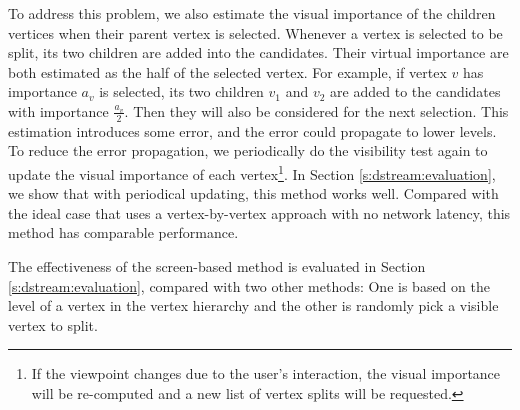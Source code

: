     To address this problem, we also estimate the visual importance of the children vertices
    when their parent vertex is selected. Whenever a vertex is selected to be split, its two children
    are added into the candidates. Their virtual importance are both estimated as the half
    of the selected vertex. For example, if vertex $v$ has importance $a_v$ is selected,
    its two children $v_1$ and $v_2$ are added to the candidates with importance $\frac{a_v}{2}$.
    Then they will also be considered for the next selection.
    This estimation introduces some error, and the error could propagate to
    lower levels. To reduce the error propagation, 
    we periodically do the visibility test again to update the visual importance of 
    each vertex\footnote{ 
    If the viewpoint changes due to the user's interaction, the visual importance will
    be re-computed and a new list of vertex splits will be requested. 
    }.
    In Section \ref{s:dstream:evaluation}, we show that
    with periodical updating, this method works well. Compared with the ideal case that
    uses a vertex-by-vertex approach with no network latency, this method has comparable performance.

    The effectiveness of the screen-based method is evaluated in Section \ref{s:dstream:evaluation},
    compared with two other methods: One is based on the level of a vertex in the 
    vertex hierarchy and the other is randomly pick a visible vertex to split.

    
    
